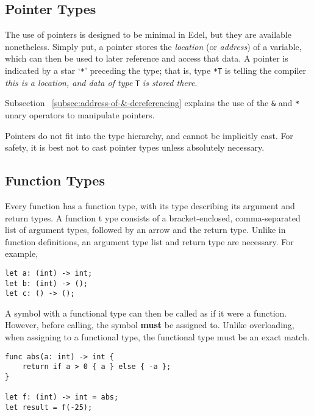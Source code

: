 \subsection{Pointer Types}\label{subsec:pointer-types}

The use of pointers is designed to be minimal in Edel, but they are available nonetheless.
Simply put, a pointer stores the \textit{location} (or \textit{address}) of a variable, which can then be used to later reference and access that data.
A pointer is indicated by a star `\texttt{*}' preceding the type;
that is, type \texttt{*T} is telling the compiler \textit{this is a location, and data of type } \texttt{T} \textit{is stored there}.

Subsection ~\ref{subsec:address-of-&-dereferencing} explains the use of the \texttt{\&} and \texttt{*} unary operators to manipulate pointers.

Pointers do not fit into the type hierarchy, and cannot be implicitly cast.
For safety, it is best not to cast pointer types unless absolutely necessary.

\subsection{Function Types}\label{subsec:function-types}

Every function has a function type, with its type describing its argument and return types.
A function t ype consists of a bracket-enclosed, comma-separated list of argument types, followed by an arrow and the return type.
Unlike in function definitions, an argument type list and return type are necessary.
For example,

\begin{lstlisting}[language=CustomLang]
let a: (int) -> int;
let b: (int) -> ();
let c: () -> ();
\end{lstlisting}

A symbol with a functional type can then be called as if it were a function.
However, before calling, the symbol \textbf{must} be assigned to.
Unlike overloading, when assigning to a functional type, the functional type must be an exact match.

\begin{lstlisting}[language=CustomLang]
func abs(a: int) -> int {
    return if a > 0 { a } else { -a };
}

let f: (int) -> int = abs;
let result = f(-25);
\end{lstlisting}

